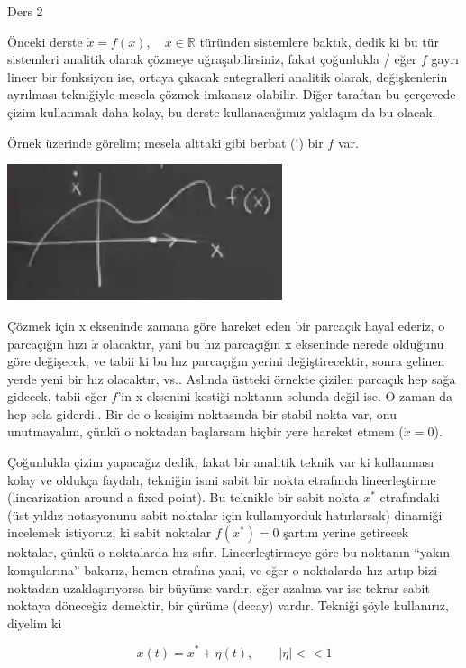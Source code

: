 \documentclass[12pt,fleqn]{article}\usepackage{../../common}
\begin{document}
Ders 2

Önceki derste $\dot{x} = f(x), \quad x \in \mathbb{R}$ türünden sistemlere
baktık, dedik ki bu tür sistemleri analitik olarak çözmeye uğraşabilirsiniz,
fakat çoğunlukla / eğer $f$ gayrı lineer bir fonksiyon ise, ortaya çıkacak
entegralleri analitik olarak, değişkenlerin ayrılması tekniğiyle mesela çözmek
imkansız olabilir. Diğer taraftan bu çerçevede çizim kullanmak daha kolay, bu
derste kullanacağımız yaklaşım da bu olacak.

Örnek üzerinde görelim; mesela alttaki gibi berbat (!) bir $f$ var. 

\includegraphics[height=4cm]{02_01.png}

Çözmek için x ekseninde zamana göre hareket eden bir parcaçık hayal ederiz, o
parcaçığın hızı $\dot{x}$ olacaktır, yani bu hız parcaçığın x ekseninde nerede
olduğunu göre değişecek, ve tabii ki bu hız parcaçığın yerini değiştirecektir,
sonra gelinen yerde yeni bir hız olacaktır, vs.. Aslında üstteki örnekte çizilen
parcaçık hep sağa gidecek, tabii eğer $f$'in x eksenini kestiği noktanın solunda
değil ise. O zaman da hep sola giderdi.. Bir de o kesişim noktasında bir stabil
nokta var, onu unutmayalım, çünkü o noktadan başlarsam hiçbir yere hareket etmem
($\dot{x}=0$).

Çoğunlukla çizim yapacağız dedik, fakat bir analitik teknik var ki kullanması
kolay ve oldukça faydalı, tekniğin ismi sabit bir nokta etrafında lineerleştirme
(linearization around a fixed point). Bu teknikle bir sabit nokta $x^*$
etrafındaki (üst yıldız notasyonunu sabit noktalar için kullanıyorduk
hatırlarsak) dinamiği incelemek istiyoruz, ki sabit noktalar $f(x^*)=0$ şartını
yerine getirecek noktalar, çünkü o noktalarda hız sıfır. Lineerleştirmeye göre
bu noktanın ``yakın komşularına'' bakarız, hemen etrafına yani, ve eğer o
noktalarda hız artıp bizi noktadan uzaklaşırıyorsa bir büyüme vardır, eğer
azalma var ise tekrar sabit noktaya döneceğiz demektir, bir çürüme (decay)
vardır. Tekniği şöyle kullanırız, diyelim ki

$$ x(t) = x^* + \eta(t), \qquad  |\eta| << 1 $$
\end{document}

